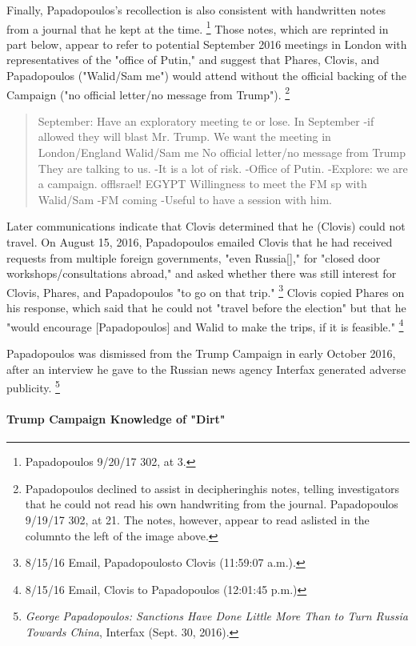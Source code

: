 Finally, Papadopoulos's recollection is also consistent with handwritten notes from a journal that he kept at the time.%
\footnote{Papadopoulos 9/20/17 302, at 3.}
Those notes, which are reprinted in part below, appear to refer to potential September 2016 meetings in London with representatives of the "office of Putin," and suggest that Phares, Clovis, and Papadopoulos ("Walid/Sam me") would attend without the official backing of the Campaign ("no official letter/no message from Trump").%
\footnote{Papadopoulos declined to assist in decipheringhis notes, telling investigators that he could not read his own handwriting from the journal.
Papadopoulos 9/19/17 302, at 21.
The notes, however, appear to read aslisted in the columnto the left of the image above.}


\begin{quote}
September: Have an exploratory meeting te or lose. In September -if allowed they will blast Mr. Trump. We want the meeting in London/England Walid/Sam me No official letter/no message from Trump They are talking to us. -It is a lot of risk. -Office of Putin. -Explore: we are a campaign. offlsrael! EGYPT Willingness to meet the FM sp with Walid/Sam -FM coming -Useful to have a session with him.
\end{quote}

Later communications indicate that Clovis determined that he (Clovis) could not travel.
On August 15, 2016, Papadopoulos emailed Clovis that he had received requests from multiple foreign governments, "even Russia[]," for "closed door workshops/consultations abroad," and asked whether there was still interest for Clovis, Phares, and Papadopoulos "to go on that trip."%
\footnote{8/15/16 Email, Papadopoulosto Clovis (11:59:07 a.m.).}
Clovis copied Phares on his response, which said that he could not "travel before the election" but that he "would encourage [Papadopoulos] and Walid to make the trips, if it is feasible."%
\footnote{8/15/16 Email, Clovis to Papadopoulos (12:01:45 p.m.)}

Papadopoulos was dismissed from the Trump Campaign in early October 2016, after an interview he gave to the Russian news agency Interfax generated adverse publicity.%
\footnote{\textit{George Papadopoulos: Sanctions Have Done Little More Than to Turn Russia Towards China}, Interfax (Sept. 30, 2016).}

\paragraph{Trump Campaign Knowledge of "Dirt"}

